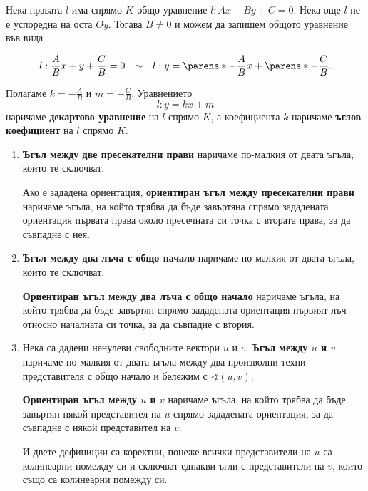 \documentclass{../../common/topic}
\begin{document}
\begin{definition}
  Нека правата \( l \) има спрямо \( K \) общо уравнение \( l: Ax + By + C = 0 \). Нека още \( l \) не е успоредна на оста \( Oy \). Тогава \( B \neq 0 \) и можем да запишем общото уравнение във вида

  \begin{align*}
    l: \frac A B x + y + \frac C B = 0
    &&\sim&&
    l: y = \parens*{-\frac A B } x + \parens*{-\frac C B }.
  \end{align*}

  Полагаме \( k = -\frac A B \) и \( m = -\frac C B \). Уравнението
  \begin{equation*}
    l: y = kx + m
  \end{equation*}
  наричаме \textbf{декартово уравнение} на \( l \) спрямо \( K \), а коефициента \( k \) наричаме \textbf{ъглов коефициент} на \( l \) спрямо \( K \).
\end{definition}

\begin{definition}
  \hfill
  \begin{enumerate}
    \item \textbf{Ъгъл между две пресекателни прави} наричаме по-малкия от двата ъгъла, които те сключват.

    Ако е зададена ориентация, \textbf{ориентиран ъгъл между пресекателни прави} наричаме ъгъла, на който трябва да бъде завъртяна спрямо зададената ориентация първата права около пресечната си точка с втората права, за да съвпадне с нея.

    \item \textbf{Ъгъл между два лъча с общо начало} наричаме по-малкия от двата ъгъла, които те сключват.

    \textbf{Ориентиран ъгъл между два лъча с общо начало} наричаме ъгъла, на който трябва да бъде завъртян спрямо зададената ориентация първият лъч относно началната си точка, за да съвпадне с втория.

    \item Нека са дадени ненулеви свободните вектори \( u \) и \( v \). \textbf{Ъгъл между \( u \) и \( v \)} наричаме по-малкия от двата ъгъла между два произволни техни представителя с общо начало и бележим с \( \sphericalangle(u, v) \).

    \textbf{Ориентиран ъгъл между \( u \) и \( v \)} наричаме ъгъла, на който трябва да бъде завъртян някой представител на \( u \) спрямо зададената ориентация, за да съвпадне с някой представител на \( v \).

    И двете дефиниции са коректни, понеже всички представители на \( u \) са колинеарни помежду си и сключват еднакви ъгли с представители на \( v \), които също са колинеарни помежду си.
  \end{enumerate}
\end{definition}
\end{document}
